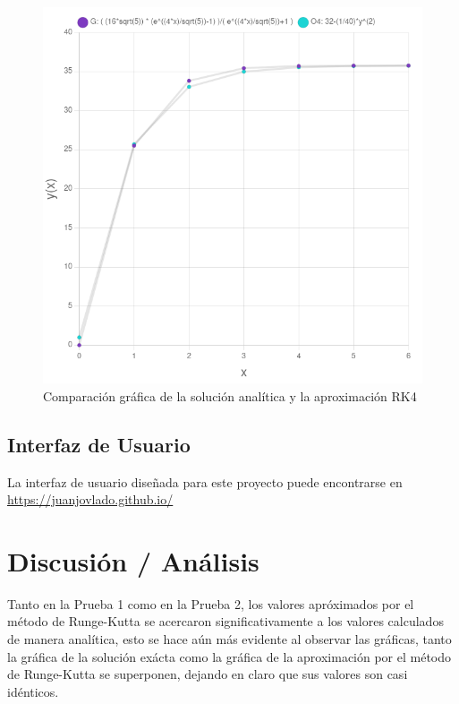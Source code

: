 \documentclass[article, 11pt]{IEEEtran}   %
\begin{document}
\begin{figure}[H]									%
\centering
\includegraphics[scale=0.35]{graficaPrueba3}%
\caption{Comparación gráfica de la solución analítica y la aproximación RK4}\label{diagram4}  %
\end{figure}

\subsection{Interfaz de Usuario}
La interfaz de usuario diseñada para este proyecto puede encontrarse en \url{https://juanjovlado.github.io/}

\section{Discusi\'on / An\'alisis}
Tanto en la Prueba 1 como en la Prueba 2, los valores apróximados por el método de Runge-Kutta se acercaron significativamente a los valores calculados de manera analítica, esto se hace aún más evidente al observar las gráficas, tanto la gráfica de la solución exácta como la gráfica de la aproximación por el método de Runge-Kutta se superponen, dejando en claro que sus valores son casi idénticos.
\vspace{1em}
\end{document}
